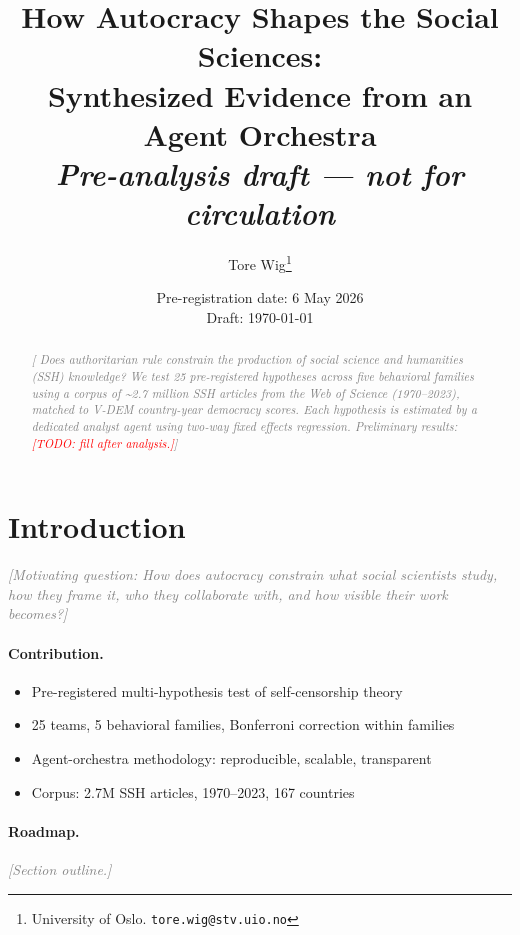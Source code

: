 \documentclass[12pt,a4paper]{article}
\title{\textbf{How Autocracy Shapes the Social Sciences:\\
Synthesized Evidence from an Agent Orchestra}\\[0.5em]
\large\normalfont\textit{Pre-analysis draft --- not for circulation}}
\author{Tore Wig\thanks{University of Oslo. \texttt{tore.wig@stv.uio.no}}
\and \todo{co-authors TBD}}
\date{Pre-registration date: 6 May 2026\\
\small Draft: \today}
\newcommand{\todo}[1]{\textcolor{red}{[TODO: #1]}}
\newcommand{\placeholder}[1]{\textcolor{gray}{\textit{[#1]}}}
\begin{document}
\maketitle
\onehalfspacing

\begin{abstract}
\placeholder{%
Does authoritarian rule constrain the production of social science and
humanities (SSH) knowledge? We test 25 pre-registered hypotheses across
five behavioral families using a corpus of \textasciitilde2.7 million SSH
articles from the Web of Science (1970--2023), matched to V-DEM
country-year democracy scores. Each hypothesis is estimated by a
dedicated analyst agent using two-way fixed effects regression.
Preliminary results: \todo{fill after analysis.}}
\end{abstract}

\tableofcontents
\clearpage

\section{Introduction}
\label{sec:intro}

\placeholder{Motivating question: How does autocracy constrain what
social scientists study, how they frame it, who they collaborate with,
and how visible their work becomes?}

\paragraph{Contribution.}
\begin{itemize}
  \item Pre-registered multi-hypothesis test of self-censorship theory
  \item 25 teams, 5 behavioral families, Bonferroni correction within families
  \item Agent-orchestra methodology: reproducible, scalable, transparent
  \item Corpus: 2.7M SSH articles, 1970--2023, 167 countries
\end{itemize}

\paragraph{Roadmap.} \placeholder{Section outline.}

\end{document}
